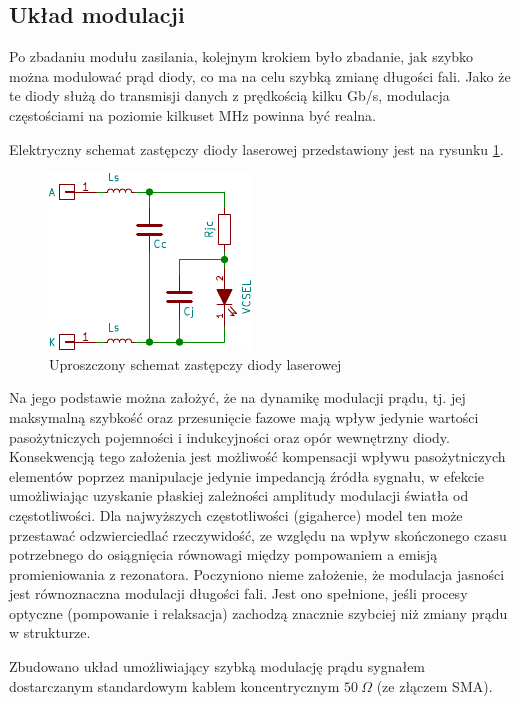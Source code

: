 \documentclass[a4paper,10pt]{article}
\begin{document}
\subsection{Układ modulacji}

Po zbadaniu modułu zasilania, kolejnym krokiem było zbadanie, jak szybko można modulować prąd diody, co ma na celu szybką zmianę długości fali. Jako że te diody służą do transmisji danych z prędkością kilku Gb/s, modulacja częstościami na poziomie kilkuset MHz powinna być realna. 

Elektryczny schemat zastępczy diody laserowej przedstawiony jest na rysunku \ref{sch-mod1}. 
\begin{figure}[h]
\begin{center}
 \includegraphics{./obrazki/sch_mod1.pdf}
\end{center}
\caption{Uproszczony schemat zastępczy diody laserowej}
\label{sch-mod1}
\end{figure}
Na jego podstawie można założyć, że na dynamikę modulacji prądu, tj. jej maksymalną szybkość oraz przesunięcie fazowe mają wpływ jedynie wartości pasożytniczych pojemności i indukcyjności oraz opór wewnętrzny diody. Konsekwencją tego założenia jest możliwość kompensacji wpływu pasożytniczych elementów poprzez manipulacje jedynie impedancją źródła sygnału, w efekcie umożliwiając uzyskanie płaskiej zależności amplitudy modulacji światła od częstotliwości.
Dla najwyższych częstotliwości (gigaherce) model ten może przestawać odzwierciedlać rzeczywidość, ze względu na wpływ skończonego czasu potrzebnego do osiągnięcia równowagi między pompowaniem a emisją promieniowania z rezonatora. Poczyniono nieme założenie, że modulacja jasności jest równoznaczna modulacji długości fali. Jest ono spełnione, jeśli procesy optyczne (pompowanie i relaksacja) zachodzą znacznie szybciej niż zmiany prądu w strukturze.

Zbudowano układ umożliwiający szybką modulację prądu sygnałem dostarczanym standardowym kablem koncentrycznym $50~\Omega$ (ze złączem SMA).
\end{document}
